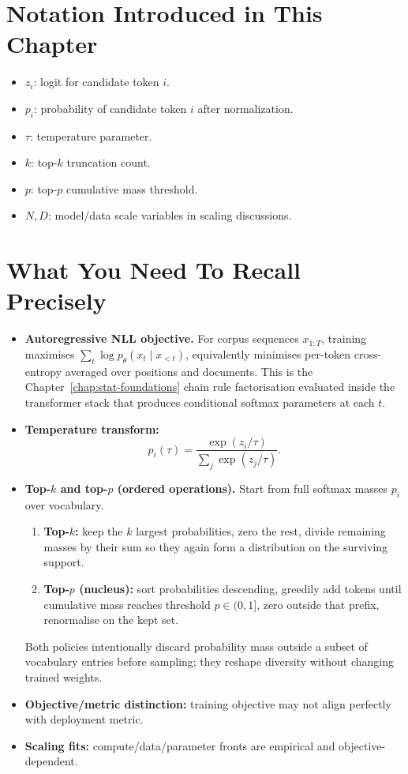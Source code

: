 \section*{Notation Introduced in This Chapter}
\begin{itemize}[leftmargin=1.5em]
  \item $z_i$: logit for candidate token $i$.
  \item $p_i$: probability of candidate token $i$ after normalization.
  \item $\tau$: temperature parameter.
  \item $k$: top-$k$ truncation count.
  \item $p$: top-$p$ cumulative mass threshold.
  \item $N,D$: model/data scale variables in scaling discussions.
\end{itemize}

\section*{What You Need To Recall Precisely}
\begin{itemize}[leftmargin=1.5em]
  \item \textbf{Autoregressive NLL objective.}
  For corpus sequences \(x_{1:T}\), training maximises \(\sum_t \log p_\theta(x_t\mid x_{<t})\), equivalently minimises per-token cross-entropy averaged over positions and documents. This is the Chapter~\ref{chap:stat-foundations} chain rule factorisation evaluated inside the transformer stack that produces conditional softmax parameters at each \(t\).
  \item \textbf{Temperature transform:}
  \[
    p_i(\tau)=\frac{\exp(z_i/\tau)}{\sum_j \exp(z_j/\tau)}.
  \]
  \item \textbf{Top-$k$ and top-$p$ (ordered operations).}
  Start from full softmax masses \(p_i\) over vocabulary.
  \begin{enumerate}[leftmargin=1.5em]
    \item \textbf{Top-$k$:} keep the $k$ largest probabilities, zero the rest, divide remaining masses by their sum so they again form a distribution on the surviving support.
    \item \textbf{Top-$p$ (nucleus):} sort probabilities descending, greedily add tokens until cumulative mass reaches threshold $p\in(0,1]$, zero outside that prefix, renormalise on the kept set.
  \end{enumerate}
  Both policies intentionally discard probability mass outside a subset of vocabulary entries before sampling; they reshape diversity without changing trained weights.
  \item \textbf{Objective/metric distinction:} training objective may not align perfectly with deployment metric.
  \item \textbf{Scaling fits:} compute/data/parameter fronts are empirical and objective-dependent.
\end{itemize}


